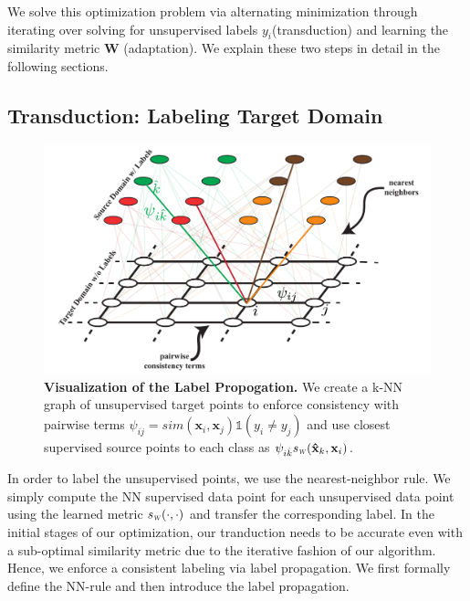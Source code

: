 We solve this optimization problem via alternating minimization through iterating over solving for unsupervised labels $y_i$(transduction) and learning the similarity metric $\mathbf{W}$ (adaptation). We explain these two steps in detail in the following sections.

 


\subsection{Transduction: Labeling Target Domain}
\label{label}
\begin{figure}[ht]
\includegraphics[width=\columnwidth]{fig11}
\vspace{-6mm}
\caption{\textbf{Visualization of the Label Propogation.} We create a k-NN graph of unsupervised target points to enforce consistency with pairwise terms 
\mbox{$\psi_{ij}=sim(\mathbf{x}_i, \mathbf{x}_j) \mathds{1}(y_i \neq y_j)$} and use closest supervised source points to each class as 
\mbox{$ \psi_{i\hat{k}} \sw(\mathbf{\hat{x}}_k,\mathbf{x}_{i})$}.} 
\label{vis_label_prop}
\end{figure}
In order to label the unsupervised points, we use the nearest-neighbor rule. We simply compute the NN supervised data point for each unsupervised data point using the learned metric $\sw(\cdot,\cdot)$ and transfer the corresponding label. In the initial stages of our optimization, our tranduction needs to be accurate even with a sub-optimal similarity metric due to the iterative fashion of our algorithm. Hence, we enforce a consistent labeling via label propagation. We first formally define the NN-rule and then introduce the label propagation.

